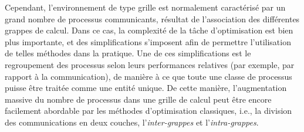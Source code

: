 Cependant, l'environnement de type grille est normalement caractérisé
par un grand nombre de processus communicants, résultat de l'association
des différentes grappes de calcul. Dans ce cas, la complexité de la
tâche d'optimisation est bien plus importante, et des simplifications
s'imposent afin de permettre l'utilisation de telles méthodes dans
la pratique. Une de ces simplifications est le regroupement des processus
selon leurs performances relatives (par exemple, par rapport à la
communication), de manière à ce que toute une classe de processus
puisse être traitée comme une entité unique. De cette manière, l'augmentation
massive du nombre de processus dans une grille de calcul peut être
encore facilement abordable par les méthodes d'optimisation classiques, i.e., la division des communications en deux couches, l'\textit{inter-grappes} et l'\textit{intra-grappes}. 

%
%

